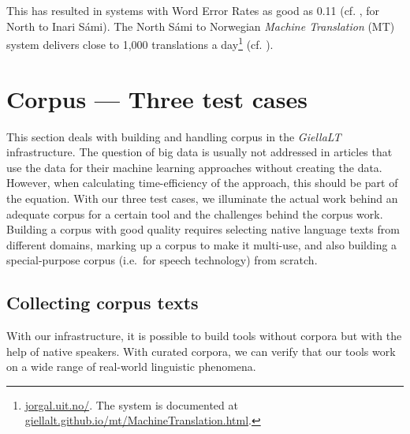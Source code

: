 \documentclass[free]{flammie}
\begin{document}
This has resulted in systems with Word Error Rates as good as 0.11 (cf.
\cite{antonsen2017machine}, for North to Inari Sámi). The North Sámi to Norwegian
\textit{Machine Translation} (MT) system delivers close to 1,000 translations a
day\footnote{\href{http://jorgal.uit.no/}{jorgal.uit.no/}. The system is
documented at
\href{https://giellalt.github.io/mt/MachineTranslation.html}{giellalt.github.io/mt/MachineTranslation.html}.}
(cf. \cite[p. 60]{Antonsen2020samiske}).


\section{Corpus --- Three test cases}\label{sec:cases}

This section deals with building and handling corpus in the \textit{GiellaLT}
infrastructure. The question of big data is usually not addressed in articles
that use the data for their machine learning approaches without creating the
data.  However, when calculating time-efficiency of the approach, this should be
part of the equation.  With our three test cases, we illuminate the actual work
behind an adequate corpus for a certain tool and the challenges behind the
corpus work.  Building a corpus with good quality requires selecting native
language texts from different domains, marking up a corpus to make it multi-use,
and also building a special-purpose corpus (i.e.\ for speech technology) from
scratch.










\subsection{Collecting corpus texts}

With our infrastructure, it is possible to build tools without corpora but with
the help of native speakers. With curated corpora, we can verify that our tools
work on a wide range of real-world linguistic phenomena.
\end{document}
